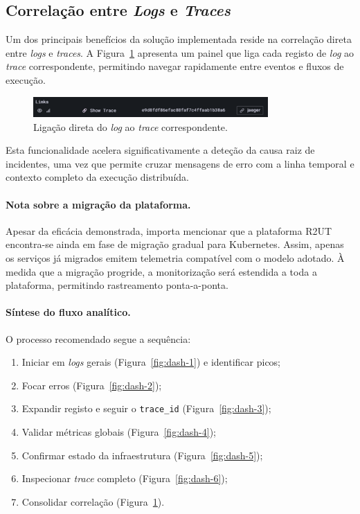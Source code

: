 \break

\subsection{Correlação entre \textit{Logs} e \textit{Traces}}

Um dos principais benefícios da solução implementada reside na correlação direta entre \textit{logs} 
e \textit{traces}. A Figura~\ref{fig:dash-7} apresenta um painel que liga cada registo de \textit{log} ao 
\textit{trace} correspondente, permitindo navegar rapidamente entre eventos e fluxos de execução.

\begin{figure}[H]
    \centering
    \includegraphics[width=0.8\textwidth]{images/Grafana/trace_link_por_log.png}
    \caption{Ligação direta do \textit{log} ao \textit{trace} correspondente.}
    \label{fig:dash-7}
\end{figure}

Esta funcionalidade acelera significativamente a deteção da causa raiz de incidentes, 
uma vez que permite cruzar mensagens de erro com a linha temporal e contexto completo 
da execução distribuída.

\paragraph{Nota sobre a migração da plataforma.}
Apesar da eficácia demonstrada, importa mencionar que a plataforma R2UT encontra-se ainda 
em fase de migração gradual para Kubernetes. Assim, apenas os serviços já migrados 
emitem telemetria compatível com o modelo adotado. À medida que a migração progride, a 
monitorização será estendida a toda a plataforma, permitindo rastreamento ponta-a-ponta.

\paragraph{Síntese do fluxo analítico.}
O processo recomendado segue a sequência:

\begin{enumerate}
\item Iniciar em \textit{logs} gerais (Figura~\ref{fig:dash-1}) e identificar picos;
\item Focar erros (Figura~\ref{fig:dash-2});
\item Expandir registo e seguir o \texttt{trace\_id} (Figura~\ref{fig:dash-3});
\item Validar métricas globais (Figura~\ref{fig:dash-4});
\item Confirmar estado da infraestrutura (Figura~\ref{fig:dash-5});
\item Inspecionar \textit{trace} completo (Figura~\ref{fig:dash-6});
\item Consolidar correlação (Figura~\ref{fig:dash-7}).
\end{enumerate}

